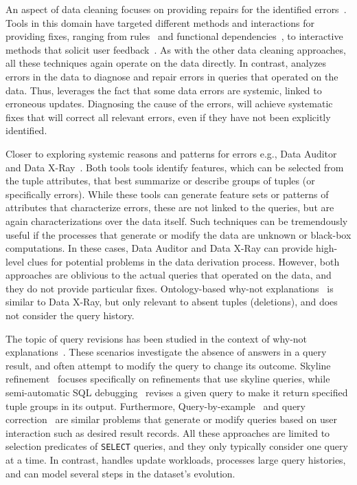 An aspect of data cleaning focuses on providing repairs for the
identified errors~\cite{ChuIP13}. Tools in this domain have targeted
different methods and interactions for providing fixes, ranging from
rules~\cite{Beskales2010, Cong2007
} and functional
dependencies~\cite{Fan2008b, ChuIP13
}, to interactive methods that
solicit user feedback~\cite{Yakout, Raman01
}. As with the other data
cleaning approaches, all these techniques again operate on the data
directly. In contrast, \sys analyzes errors in the data to diagnose
and repair errors in queries that operated on the data. Thus, \sys
leverages the fact that some data errors are systemic, linked to
erroneous updates. Diagnosing the cause of the errors, will achieve
systematic fixes that will correct all relevant errors, even if they
have not been explicitly identified.

Closer to exploring systemic reasons and patterns for errors e.g.,
 Data Auditor~\cite{GolabKKS10, Golab2008
} and Data X-Ray~\cite{wang2015}. Both tools tools identify features, which can
be selected from the tuple attributes, that best summarize or describe
groups of tuples (or specifically errors). While these tools can
generate feature sets or patterns of attributes that characterize
errors, these are not linked to the queries, but are again
characterizations over the data itself. Such techniques can be
tremendously useful if the processes that generate or modify the data
are unknown or black-box computations. In these cases, Data Auditor
and Data X-Ray can provide high-level clues for potential problems in
the data derivation process. However, both approaches are oblivious to
the actual queries that operated on the data, and they do not provide
particular fixes. Ontology-based why-not
explanations~\cite{tenCate2015} is similar to Data X-Ray, but 
only relevant to absent tuples (deletions), and does not
consider the query history.

The topic of query revisions has been studied in the context of
why-not explanations~\cite{Chapman2009}. These scenarios investigate
the absence of answers in a query result, and often attempt to modify
the query to change its outcome. Skyline
refinement~\cite{tran2010conquer} focuses specifically on refinements
that use skyline queries, while semi-automatic SQL
debugging~\cite{tzompanaki14semi} revises a given query to make it
return specified tuple groups in its output.  Furthermore, Query-by-example~\cite{zloof1977query} 
and query correction~\cite{abouzied2012dataplay} are similar problems that generate or modify
queries based on user interaction such as desired result records.
All these approaches are
limited to selection predicates of \texttt{SELECT} queries, and they
only typically consider one query at a time. In contrast, \sys handles
update workloads, processes large query histories, and can model
several steps in the dataset's evolution. 

